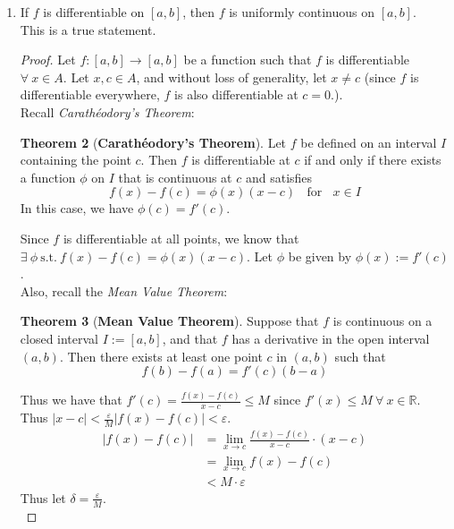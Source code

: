 \documentclass[12pt,letterpaper]{article}
\newcommand{\st}{\ \text{s.t.}\ }
\newcommand{\R}{\mathbb{R}}
\theoremstyle{case}
\theoremstyle{definition}
\newtheorem*{theorem*}{Theorem}
\begin{document}
\begin{enumerate}
\begin{enumerate}
			This is true by \textit{Theorem 6.1.2}:
			\begin{theorem*}
				If $f:I \rightarrow \R$ has a derivative at $c \in I$, then $f$ is continuous at $c$.\\
			\end{theorem*}
			\item If $f$ is differentiable on $[a,b]$, then $f$ is uniformly continuous on $[a,b]$.\\
			
			This is a true statement.
			\begin{proof}
				Let $f: [a,b] \to [a,b]$ be a function such that $f$ is differentiable $\forall\ x \in A$. Let $x,c \in A$, and without loss of generality, let $x \neq c$ (since $f$ is differentiable everywhere, $f$ is also differentiable at $c=0$.).\\
				
				Recall \textit{Carathéodory's Theorem}:
				\begin{theorem*}[\textbf{Carathéodory's Theorem}]
					Let $f$ be defined on an interval $I$ containing the point $c$. Then $f$ is differentiable at $c$ if and only if there exists a function $\phi$ on $I$ that is continuous at $c$ and satisfies
					\[f(x)-f(c)=\phi (x)(x-c)\ \ \ \ \text{for}\ \ \ \ x \in I\]
					In this case, we have $\phi (c)=f'(c)$.
				\end{theorem*}
				Since $f$ is differentiable at all points, we know that $\exists\ \phi \st f(x)-f(c)=\phi(x)(x-c)$. Let $\phi$ be given by $\phi(x):= f'(c)$.\\
				
				Also, recall the \textit{Mean Value Theorem}:
				\begin{theorem*}[\textbf{Mean Value Theorem}]
					Suppose that $f$ is continuous on a closed interval $I:=[a,b]$, and that $f$ has a derivative in the open interval $(a,b)$. Then there exists at least one point $c$ in $(a,b)$ such that
					\[f(b)-f(a)=f'(c)(b-a)\]
				\end{theorem*}
				Thus we have that $f'(c)=\frac{f(x)-f(c)}{x-c} \leq M$ since $f'(x) \leq M\ \forall\ x \in \R$. Thus $|x-c|<\frac{\varepsilon}{M}|f(x)-f(c)|<\varepsilon$.
				\begin{align*}
					|f(x)-f(c)|&=\lim\limits_{x \to c} \frac{f(x)-f(c)}{x-c} \cdot (x-c) \\
					&= \lim\limits_{x \to c} f(x)-f(c) \\
					&< M \cdot \varepsilon
				\end{align*}
				Thus let $\delta = \frac{\varepsilon}{M}$.\\
				

\end{proof}
\end{enumerate}
\end{enumerate}
\end{document}
